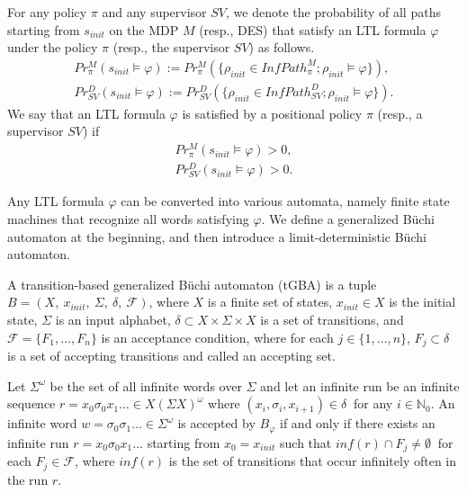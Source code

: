 \begin{definition}
For any policy $\pi$ and any supervisor $SV$, we denote the probability of all paths starting from $s_{init}$ on the MDP $M$ (resp., DES) that satisfy an LTL formula $\varphi$ under the policy $\pi$ (resp., the supervisor $SV$) as follows.
\begin{align*}
Pr^{M}_{\pi}(s_{init} \! \models \varphi) := Pr^{M}_{\pi}(\{ \rho_{init} \! \in \! InfPath^{M}_{\pi} ; \rho_{init} \! \models \varphi \}), \\
Pr^{D}_{SV}(s_{init} \! \models \varphi) := Pr^{D}_{SV}(\{ \rho_{init} \! \in \! InfPath^{D}_{SV} ; \rho_{init} \! \models \varphi \}).
\end{align*}
We say that an LTL formula $\varphi$ is satisfied by a positional policy $\pi$ (resp., a supervisor $SV$) if
\begin{align*}
Pr^{M}_{\pi}(s_{init} \models \varphi) > 0,  \\
Pr^{D}_{SV}(s_{init} \models \varphi) > 0.
\end{align*}



\label{def5}
\end{definition}

Any LTL formula $\varphi$ can be converted into various automata, namely finite state machines that recognize %
all words satisfying $\varphi$.
 We define a generalized B\"{u}chi automaton at the beginning, and then introduce a limit-deterministic B\"{u}chi automaton.

\begin{definition}
  A transition-based generalized B\"{u}chi automaton (tGBA) is a tuple $B = (X,\ x_{init},\ \Sigma,\ \delta,\ \mathcal{F})$, where $X$ is a finite set of states, $x_{init} \in X$ is the initial state, $\Sigma$ is an input alphabet, $\delta \subset  X\times \Sigma \times X$ is a set of transitions, and $\mathcal{F} = \{F_1,\ldots,F_n\}$ is an acceptance condition, where for each $ j \in \{1,\ldots,n\}$, $F_j \subset \delta$ is a set of accepting transitions and called an accepting set.

  Let $\Sigma^{\omega}$ be the set of all infinite words over $\Sigma$ and let an infinite run be an infinite sequence $r = x_0\sigma_0x_1 \ldots \in X (\Sigma X)^{\omega}$ where $(x_i, \sigma_{i}, x_{i+1}) \in \delta\ $ for any $ i\in \mathbb{N}_0$. An infinite word $w = \sigma_0\sigma_1 \ldots \in \Sigma^{\omega}$ is accepted by $B_{\varphi}$ if and only if there exists an infinite run $r = x_0 \sigma_0 x_1 \ldots$ starting from $x_0 = x_{init}$ such that $inf(r) \cap F_j \neq \emptyset\ $ for each $F_j \in \mathcal{F}$, where $inf(r)$ is the set of transitions that occur infinitely often in the run $r$.
\end{definition}

